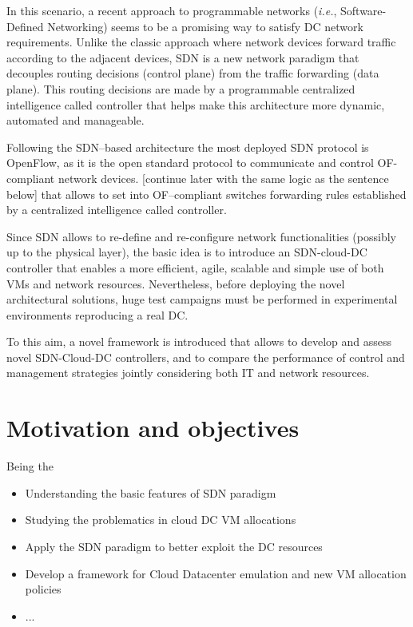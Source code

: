 \documentclass[12pt,english]{book}
\begin{document}
In this scenario, a recent approach to programmable networks (\textit{i.e.}, Software-Defined Networking) seems to be a promising way to satisfy DC network requirements\cite{ibmnec}. 
Unlike the classic approach where network devices forward traffic according to the adjacent devices, SDN is a new network paradigm that decouples routing decisions (control plane) from the traffic forwarding (data plane). This routing decisions are made by a programmable centralized intelligence called controller that helps make this architecture more dynamic, automated and manageable.

Following the SDN--based architecture the most deployed SDN protocol is OpenFlow\cite{openflow}\cite{onf}, as it is the open standard protocol to communicate and control OF-compliant network devices.
[continue later with the same logic as the sentence below]
 that allows to set into OF--compliant switches forwarding rules established by a centralized intelligence called controller.

Since SDN allows to re-define and re-configure network functionalities (possibly up to the physical layer), the basic idea is to introduce an SDN-cloud-DC controller that enables a more efficient, agile, scalable and simple use of both VMs and network resources.
Nevertheless, before deploying the novel architectural solutions, huge test campaigns must be performed in experimental environments reproducing a real DC.

To this aim, a novel framework is introduced that allows to develop and assess novel SDN-Cloud-DC controllers, and to compare the performance of control and management strategies jointly considering both IT and network resources\cite{im2013}.

\section{Motivation and objectives\label{sec:motobj}}

Being the 
\begin{itemize}
	\item Understanding the basic features of SDN paradigm
	\item Studying the problematics in cloud DC VM allocations
	\item Apply the SDN paradigm to better exploit the DC resources
	\item Develop a framework for Cloud Datacenter emulation and new VM allocation policies
	\item ...
\end{itemize}
\end{document}
